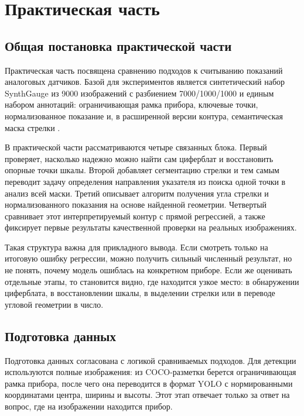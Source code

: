 \documentclass[a4paper,14pt]{extarticle}
\begin{document}
	\newpage
	\section{Практическая часть}

	\subsection{Общая постановка практической части}

Практическая часть посвящена сравнению подходов к считыванию показаний аналоговых датчиков. Базой для экспериментов является синтетический набор SynthGauge из 9000 изображений с разбиением 7000/1000/1000 и единым набором аннотаций: ограничивающая рамка прибора, ключевые точки, нормализованное показание и, в расширенной версии контура, семантическая маска стрелки \cite{howells2021,leon2024,reitsma2024,sciRep2025,meterRegression2024,synthgaugehf2026}.

В практической части рассматриваются четыре связанных блока. Первый проверяет, насколько надежно можно найти сам циферблат и восстановить опорные точки шкалы. Второй добавляет сегментацию стрелки и тем самым переводит задачу определения направления указателя из поиска одной точки в анализ всей маски. Третий описывает алгоритм получения угла стрелки и нормализованного показания на основе найденной геометрии. Четвертый сравнивает этот интерпретируемый контур с прямой регрессией, а также фиксирует первые результаты качественной проверки на реальных изображениях.

Такая структура важна для прикладного вывода. Если смотреть только на итоговую ошибку регрессии, можно получить сильный численный результат, но не понять, почему модель ошиблась на конкретном приборе. Если же оценивать отдельные этапы, то становится видно, где находится узкое место: в обнаружении циферблата, в восстановлении шкалы, в выделении стрелки или в переводе угловой геометрии в число.

	\subsection{Подготовка данных}

Подготовка данных согласована с логикой сравниваемых подходов. Для детекции используются полные изображения: из COCO-разметки берется ограничивающая рамка прибора, после чего она переводится в формат YOLO с нормированными координатами центра, ширины и высоты. Этот этап отвечает только за ответ на вопрос, где на изображении находится прибор.
\end{document}
